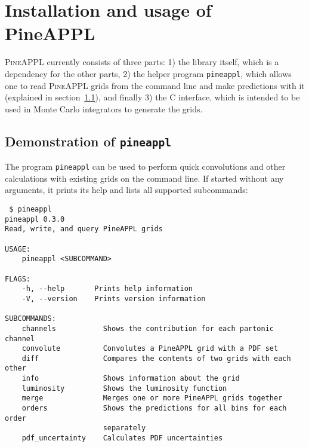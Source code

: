 \section{Installation and usage of PineAPPL}
\label{app:pineappl}

\textsc{PineAPPL} currently consists of three parts: 1) the library itself, which is a dependency for the other parts, 2) the helper program \texttt{pineappl}, which allows one to read \textsc{PineAPPL} grids from the command line and make predictions with it (explained in section~\ref{app:pineappl-demo}), and finally 3) the C interface, which is intended to be used in Monte Carlo integrators to generate the grids.

\subsection{Demonstration of \texorpdfstring{\texttt{pineappl}}{pineappl}}
\label{app:pineappl-demo}

The program \texttt{pineappl} can be used to perform quick convolutions and other calculations with existing grids on the command line.
If started without any arguments, it prints its help and lists all supported subcommands:
\begin{verbatim}
 $ pineappl
pineappl 0.3.0
Read, write, and query PineAPPL grids

USAGE:
    pineappl <SUBCOMMAND>

FLAGS:
    -h, --help       Prints help information
    -V, --version    Prints version information

SUBCOMMANDS:
    channels           Shows the contribution for each partonic channel
    convolute          Convolutes a PineAPPL grid with a PDF set
    diff               Compares the contents of two grids with each other
    info               Shows information about the grid
    luminosity         Shows the luminosity function
    merge              Merges one or more PineAPPL grids together
    orders             Shows the predictions for all bins for each order
                       separately
    pdf_uncertainty    Calculates PDF uncertainties
\end{verbatim}


